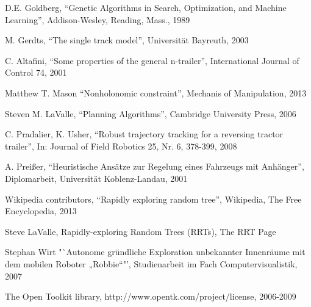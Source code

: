 \documentclass[bsc,en,
oneside,12pt,utf8,a4paper,
]{thesisdifctunl}
\begin{document}
\begin{thebibliography}{9}
	D.E. Goldberg,
	"`Genetic Algorithms in Search, Optimization, and Machine Learning"',
	Addison-Wesley, Reading, Mass.,
	1989
	
	M. Gerdts,
	"`The single track model"',
	Universität Bayreuth,
	2003
	
	C. Altafini,
	"`Some properties of the general n-trailer"',
	International Journal of Control 74,
	2001
	
	Matthew T. Mason
	"`Nonholonomic constraint"',
	Mechanis of Manipulation,
	2013
	
	Steven M. LaValle,
	"`Planning Algorithms"',
	Cambridge University Press,
	2006
	
	C. Pradalier, K. Usher,
	"`Robust trajectory tracking for a reversing tractor trailer"',
	In: Journal of Field Robotics 25, Nr. 6, 378-399,
	2008
	
	A. Preißer,
	"`Heuristische Ansätze zur Regelung eines Fahrzeugs mit Anhänger"',
	Diplomarbeit, Universität Koblenz-Landau,
	2001
	
	Wikipedia contributors,
	"`Rapidly exploring random tree"',
	Wikipedia, The Free Encyclopedia,
	2013
	
	Steve LaValle,
	Rapidly-exploring Random Trees (RRTs),
	The RRT Page

	Stephan Wirt
	"`Autonome gründliche Exploration unbekannter Innenräume mit dem mobilen Roboter „Robbie“"',
	Studienarbeit im Fach Computervisualistik,
	2007
	
	The Open Toolkit library,
	http://www.opentk.com/project/license,
	2006-2009

\end{thebibliography}


\end{document}
